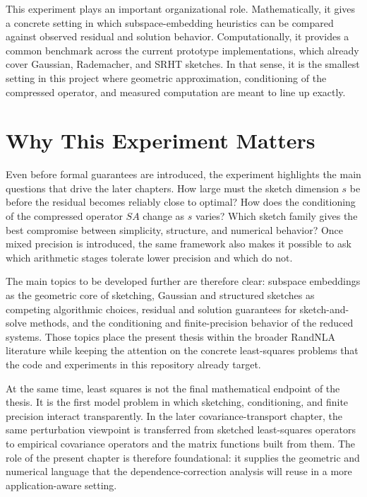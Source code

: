 This experiment plays an important organizational role. Mathematically, it gives a concrete setting in which subspace-embedding heuristics can be compared against observed residual and solution behavior. Computationally, it provides a common benchmark across the current prototype implementations, which already cover Gaussian, Rademacher, and SRHT sketches. In that sense, it is the smallest setting in this project where geometric approximation, conditioning of the compressed operator, and measured computation are meant to line up exactly.

\section{Why This Experiment Matters}

Even before formal guarantees are introduced, the experiment highlights the main questions that drive the later chapters. How large must the sketch dimension \(s\) be before the residual becomes reliably close to optimal? How does the conditioning of the compressed operator \(SA\) change as \(s\) varies? Which sketch family gives the best compromise between simplicity, structure, and numerical behavior? Once mixed precision is introduced, the same framework also makes it possible to ask which arithmetic stages tolerate lower precision and which do not.

The main topics to be developed further are therefore clear: subspace embeddings as the geometric core of sketching, Gaussian and structured sketches as competing algorithmic choices, residual and solution guarantees for sketch-and-solve methods, and the conditioning and finite-precision behavior of the reduced systems. Those topics place the present thesis within the broader RandNLA literature while keeping the attention on the concrete least-squares problems that the code and experiments in this repository already target.

At the same time, least squares is not the final mathematical endpoint of the
thesis. It is the first model problem in which sketching, conditioning, and finite
precision interact transparently. In the later covariance-transport chapter, the
same perturbation viewpoint is transferred from sketched least-squares operators
to empirical covariance operators and the matrix functions built from them. The
role of the present chapter is therefore foundational: it supplies the geometric and
numerical language that the dependence-correction analysis will reuse in a more
application-aware setting.
